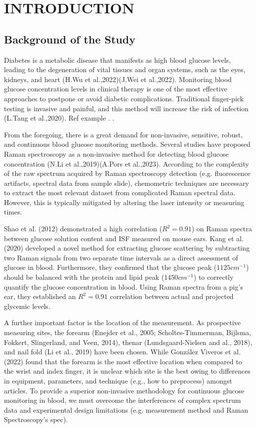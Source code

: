 \chapter{INTRODUCTION} 

\section{Background of the Study}

Diabetes is a metabolic disease that manifests as high blood glucose levels, leading to the degeneration of vital tissues and organ systems, such as the eyes, kidneys, and heart (H.Wu et al.,2022)(J.Wei et al.,2022). 
Monitoring blood glucose concentration levels in clinical therapy is one of the most effective approaches to postpone or avoid diabetic complications. 
Traditional finger-pick testing is invasive and painful, and this method will increase the risk of infection (L.Tang et al.,2020). 
Ref example \cite{NIR2017, continuous2018}. \citep{continuous2018}.

From the foregoing, there is a great demand for non-invasive, sensitive, robust, and continuous blood glucose monitoring methods. 
Several studies have proposed Raman spectroscopy as a non-invasive method for detecting blood glucose concentration (N.Li et al.,2019)(A.Pors et al.,2023). 
According to the complexity of the raw spectrum acquired by Raman spectroscopy detection (e.g. fluorescence artifacts, spectral data from sample slide), chemometric techniques are necessary to extract the most relevant dataset from complicated Raman spectral data. 
However, this is typically mitigated by altering the laser intensity or measuring times.

Shao et al. (2012) demonstrated a high correlation ($R^2 = 0.91$) on Raman spectra between glucose solution content and ISF measured on mouse ears. 
Kang et al. (2020) developed a novel method for extracting glucose scattering by subtracting two Raman signals from two separate time intervals as a direct assessment of glucose in blood. 
Furthermore, they confirmed that the glucose peak ($1125cm^{-1}$) should be balanced with the protein and lipid peak ($1450cm^{-1}$) to correctly quantify the glucose concentration in blood. 
Using Raman spectra from a pig's ear, they established an $R^2 = 0.91$ correlation between actual and projected glycemic levels.

A further important factor is the location of the measurement. 
As prospective measuring sites, the forearm (Enejder et al., 2005; Scholtes-Timmerman, Bijlsma, Fokkert, Slingerland, and Veen, 2014), thenar (Lundsgaard-Nielsen and al., 2018), and nail fold (Li et al., 2019) have been chosen. 
While González Viveros et al. (2022) found that the forearm is the most effective location when compared to the wrist and index finger, it is unclear which site is the best owing to differences in equipment, parameters, and technique (e.g., how to preprocess) amongst articles. 
To provide a superior non-invasive methodology for continuous glucose monitoring in blood, we must overcome the interferences of complex spectrum data and experimental design limitations (e.g. measurement method and Raman Spectroscopy's spec).

